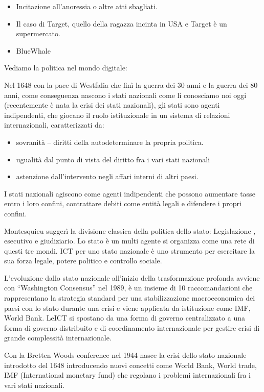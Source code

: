 \documentclass[a4page, 11pt]{article}
\begin{document}
\begin{itemize}
	 
	\item
	Incitazione all'anoressia o altre atti sbagliati.
	\item
	Il caso di Target, quello della ragazza incinta in USA e Target è un
	supermercato.
	\item
	BlueWhale
\end{itemize}

Vediamo la politica nel mondo digitale:

Nel 1648 con la pace di Westfalia che finì la guerra dei 30 anni e la
guerra dei 80 anni, come conseguenza nascono i stati nazionali come li
conosciamo noi oggi (recentemente è nata la crisi dei stati nazionali),
gli stati sono agenti indipendenti, che giocano il ruolo istituzionale
in un sistema di relazioni internazionali, caratterizzati da:

\begin{itemize}
	 
	\item
	sovranità -- diritti della autodeterminare la propria politica.
	\item
	ugualità dal punto di vista del diritto fra i vari stati nazionali
	\item
	astenzione dall'intervento negli affari interni di altri paesi.
\end{itemize}

I stati nazionali agiscono come agenti indipendenti che possono
aumentare tasse entro i loro confini, contrattare debiti come entità
legali e difendere i propri confini.

Montesquieu suggerì la divisione classica della politica dello stato:
Legislazione , esecutivo e giudiziario. Lo stato è un multi agente si
organizza come una rete di questi tre mondi. ICT per uno stato nazionale
è uno strumento per esercitare la sua forza legale, potere politico e
controllo sociale.

L'evoluzione dallo stato nazionale all'inizio della trasformazione
profonda avviene con ``Washington Consensus'' nel 1989, è un insieme di
10 raccomandazioni che rappresentano la strategia standard per una
stabilizzazione macroeconomica dei paesi con lo stato durante una crisi
e viene applicata da istituzione come IMF, World Bank. LeICT si spostano
da una forma di governo centralizzato a una forma di governo distribuito
e di coordinamento internazionale per gestire crisi di grande
complessità internazionale.

Con la Bretten Woods conference nel 1944 nasce la crisi dello stato
nazionale introdotto del 1648 introducendo nuovi concetti come World
Bank, World trade, IMF (International monetary fund) che regolano i
problemi internazionali fra i vari stati nazionali.
\end{document}
